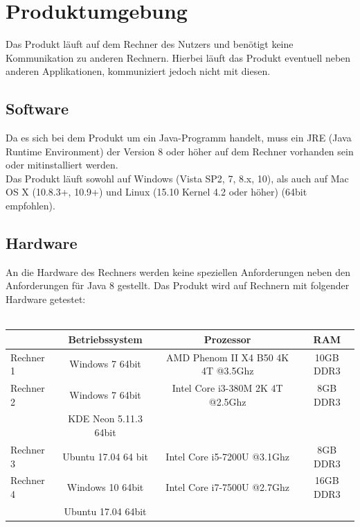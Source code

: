 \documentclass[parskip=full]{scrartcl}
\let\glsplgen\glsuseri
\begin{document}

 

\section{Produktumgebung}
Das Produkt läuft auf dem Rechner des Nutzers und benötigt keine Kommunikation zu anderen Rechnern. Hierbei läuft das Produkt eventuell neben anderen Applikationen, kommuniziert jedoch nicht mit diesen.

\subsection{Software}
Da es sich bei dem Produkt um ein Java-Programm handelt, muss ein JRE (Java Runtime Environment) der Version 8 oder höher auf dem Rechner vorhanden sein oder mitinstalliert werden. \\
Das Produkt läuft sowohl auf Windows (Vista SP2, 7, 8.x, 10), als auch auf Mac OS X (10.8.3+, 10.9+) und Linux (15.10 Kernel 4.2 oder höher) (64bit empfohlen).

\subsection{Hardware}
An die Hardware des Rechners werden keine speziellen Anforderungen neben den Anforderungen für Java 8 gestellt. Das Produkt wird auf Rechnern mit folgender Hardware getestet: \\ \\
\begin{tabular}{l||c|c|c}
   	& Betriebssystem & Prozessor & RAM \\
	\hline
	\hline
	Rechner 1 & Windows 7 64bit & AMD Phenom II X4 B50 4K 4T @3.5Ghz & 10GB DDR3 \\
	Rechner 2 & Windows 7 64bit & Intel Core i3-380M 2K 4T @2.5Ghz & 8GB DDR3 \\
	 & KDE Neon 5.11.3 64bit &  \\
	Rechner 3 & Ubuntu 17.04 64 bit & Intel Core i5-7200U @3.1Ghz & 8GB DDR3 \\
	Rechner 4 & Windows 10 64bit & Intel Core i7-7500U @2.7Ghz & 16GB DDR3\\
		& Ubuntu 17.04 64bit\\
\end{tabular}
\newpage
\end{document}
